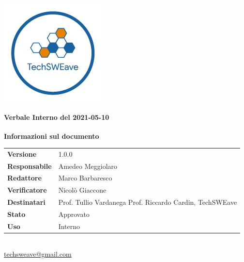 \documentclass[a4paper]{article}
\begin{document}
\begin{titlepage}
    \begin{center}
        \includegraphics{../../../../Images/logo.png}\\
        \vspace{20px}
        \textcolor{logo}{\hrulefill}\\
        \vspace{20px}
        \textbf{\huge\textcolor{logo}{Verbale Interno del 2021-05-10}}\\
        \vspace{10px}
        \textcolor{logo}{\hrulefill}\\
        \vspace{40px}
        \textbf{\Large Informazioni sul documento}\\
        \vspace{20px}
        \begin{tabular}{p{100px} | p{100px}}
            \textbf{Versione}     & 1.0.0                                                                      \\
            \textbf{Responsabile} & Amedeo Meggiolaro                                                          \\
            \textbf{Redattore}    & Marco Barbaresco                                                           \\
            \textbf{Verificatore} & Nicolò Giaccone                                                            \\
            \textbf{Destinatari}  & Prof. Tullio Vardanega \newline Prof. Riccardo Cardin, \newline TechSWEave \\
            \textbf{Stato}        & Approvato                                                                  \\
            \textbf{Uso}          & Interno                                                                    \\
        \end{tabular}\\
        \vspace{60px}
        \href{mailto:techsweave@gmail.com}{techsweave@gmail.com}\\

    \end{center}
\end{titlepage}
\end{document}
